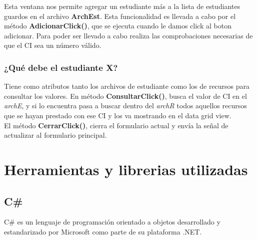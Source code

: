 \documentclass[12pt]{article}
\begin{document}
Esta ventana nos permite agregar un estudiante más a la lista de estudiantes guardos en el archivo \textbf{ArchEst}.  Esta funcionalidad es llevada a cabo por el método \textbf{AdicionarClick()}, que se ejecuta cuando le damos click al boton adicionar.  Para poder ser llevado a cabo realiza las comprobaciones necesarias de que el CI sea un número válido.  

\subsubsection{¿Qué debe el estudiante X?}

Tiene como atributos tanto los archivos de estudiante como los de recursos para consultar los valores.  
En método \textbf{ConsultarClick()}, busca el valor de CI en el \textit{archE}, y si lo encuentra pasa a buscar dentro del \textit{archR} todos aquellos recursos que se hayan prestado con ese CI y los va mostrando en el data grid view.  \\
El método \textbf{CerrarClick()}, cierra el formulario actual y envía la señal de actualizar al formulario principal.  
\newpage
\section{Herramientas y librerias utilizadas}
\subsection{C\#}
C\# es un lenguaje de programación orientado a objetos desarrollado y estandarizado por Microsoft como parte de su plataforma .NET. 
\end{document}

